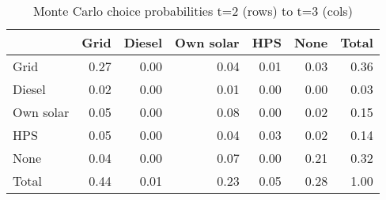 \begin{table}[!ht]
	\centering
		\caption{Monte Carlo choice probabilities t=2 (rows) to t=3 (cols)}
\begin{tabular}{lrrrrrr}
		\toprule
               &      Grid&    Diesel& Own solar&       HPS&      None&     Total\\
		\midrule
		           Grid&      0.27&      0.00&      0.04&      0.01&      0.03&      0.36\\
		         Diesel&      0.02&      0.00&      0.01&      0.00&      0.00&      0.03\\
		      Own solar&      0.05&      0.00&      0.08&      0.00&      0.02&      0.15\\
		            HPS&      0.05&      0.00&      0.04&      0.03&      0.02&      0.14\\
		           None&      0.04&      0.00&      0.07&      0.00&      0.21&      0.32\\
		          Total&      0.44&      0.01&      0.23&      0.05&      0.28&      1.00\\
		\bottomrule
	\end{tabular}
\end{table}
